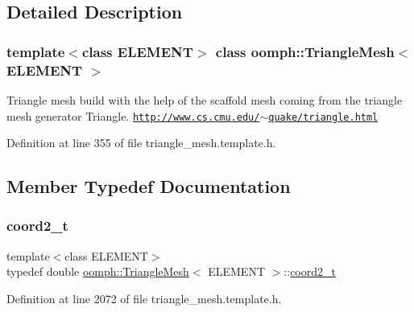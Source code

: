 \subsection{Detailed Description}
\subsubsection*{template$<$class E\+L\+E\+M\+E\+NT$>$\newline
class oomph\+::\+Triangle\+Mesh$<$ E\+L\+E\+M\+E\+N\+T $>$}

Triangle mesh build with the help of the scaffold mesh coming from the triangle mesh generator Triangle. \href{http://www.cs.cmu.edu/~quake/triangle.html}{\tt http\+://www.\+cs.\+cmu.\+edu/$\sim$quake/triangle.\+html} 

Definition at line 355 of file triangle\+\_\+mesh.\+template.\+h.



\subsection{Member Typedef Documentation}
\mbox{\label{classoomph_1_1TriangleMesh_afd4948d805e89116cc5da629e413a449}} 
\subsubsection{\texorpdfstring{coord2\+\_\+t}{coord2\_t}}
{\footnotesize\ttfamily template$<$class E\+L\+E\+M\+E\+NT$>$ \\
typedef double \hyperlink{classoomph_1_1TriangleMesh}{oomph\+::\+Triangle\+Mesh}$<$ E\+L\+E\+M\+E\+NT $>$\+::\hyperlink{classoomph_1_1TriangleMesh_afd4948d805e89116cc5da629e413a449}{coord2\+\_\+t}\hspace{0.3cm}{\ttfamily [private]}}



Definition at line 2072 of file triangle\+\_\+mesh.\+template.\+h.

\mbox{\label{classoomph_1_1TriangleMesh_ad50b14a66b40a3bfb22a43df86c9006e}} 
